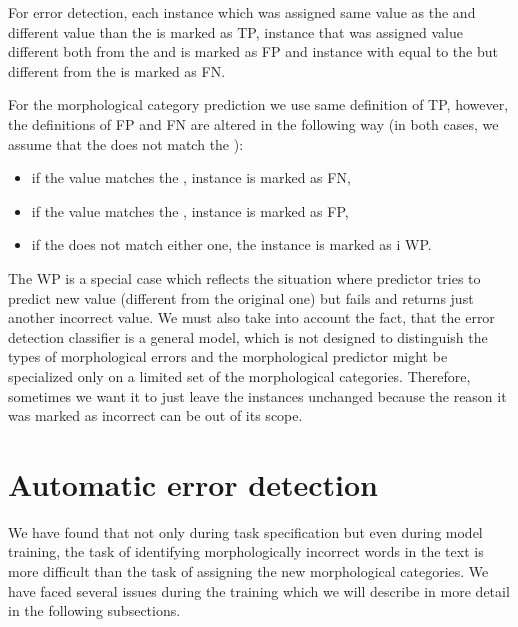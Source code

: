 For error detection, each instance which was assigned same value as the 
and different value than the  is marked as TP, instance
that was assigned value different both from the  and 
is marked as FP and instance with  equal to the 
but different from the  is marked as FN.

For the morphological category prediction we use same definition of TP, however, the definitions
of FP and FN are altered in the following way (in both cases, we assume that the 
does not match the ):
\begin{itemize}
\item if the  value matches the , instance is marked as FN,
\item if the  value matches the , instance is marked as FP,
\item if the  does not match either one, the instance is marked as i WP.
\end{itemize}

The WP is a special case which reflects the situation where predictor tries to predict new value (different
from the original one) but fails and returns just another incorrect value. We must also take into account
the fact, that the error detection classifier is a general model, which is not designed to distinguish
the types of morphological errors and the morphological predictor might be specialized only on a limited
set of the morphological categories. Therefore, sometimes we want it to just leave the 
instances unchanged because the reason it was marked as incorrect can be out of its scope.

\section{Automatic error detection}


We have found that not only during task specification but even during model training,
the task of identifying morphologically incorrect words in the text is more difficult
than the task of assigning the new morphological categories. We have faced several issues
during the training which we will describe in more detail in the following subsections.

